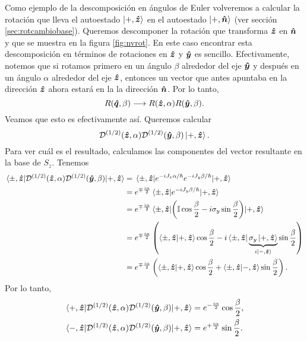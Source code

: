 \documentclass[10pt, a4paper]{article}
\numberwithin{equation}{subsection}
\begin{document}
Como ejemplo de la descomposición en ángulos de Euler volveremos a calcular la
rotación que lleva el autoestado $\ket{+,\vu*{z}}$ en el autoestado
$\ket{+,\vu*{n}}$ (ver sección \ref{sec:rotcambiobase}). Queremos descomponer
la rotación que transforma $\vu*{z}$ en $\vu*{n}$ y que se muestra en la
figura \ref{fig:nvrot}. En este caso encontrar esta descomposición en términos
de rotaciones en $\vu*{z}$ y $\vu*{y}$ es sencillo. Efectivamente, notemos
que si rotamos primero en un ángulo $\beta$ alrededor del eje $\vu*{y}$ y
después en un ángulo $\alpha$ alrededor del eje $\vu*{z}$, entonces un vector
que antes apuntaba en la dirección $\vu*{z}$ ahora estará en la la dirección
$\vu*{n}$. Por lo tanto,
\begin{equation}
  R(\vu*{q},\beta) \longrightarrow R(\vu*{z},\alpha)R(\vu*{y},\beta).
\end{equation}
Veamos que esto es efectivamente así. Queremos calcular
\begin{equation}
  \RotationOp[1/2](\vers{z},\alpha)\RotationOp[1/2](\vers{y},\beta)\ket{+,\vers{z}}.
\end{equation}
Para ver cuál es el resultado, calculamos las componentes del vector resultante
en la base de $S_z$. Tenemos
\begin{align}
  \matrixel{\pm,\vers{z}} {\RotationOp[1/2](\vers{z},\alpha)
    \RotationOp[1/2](\vers{y},\beta)}{+,\vers{z}} &=
    \matrixel{\pm,\vers{z}} {e^{-iJ_z\alpha/\hbar} e^{-iJ_y\beta/\hbar}}
    {+,\vers{z}} \nonumber \\
  &= e^{\mp \frac{i \alpha}{2}} \matrixel{\pm,\vers{z}}{e^{-iJ_y\beta/\hbar}}
    {+,\vers{z}} \nonumber \\
  &= e^{\mp \frac{i \alpha}{2}} \matrixel{\pm,\vers{z}}{\left(
    \Id\cos\frac{\beta}{2} -i\sigma_y\sin\frac{\beta}{2}\right)} {+,\vers{z}}
    \nonumber \\
  &= e^{\mp \frac{i \alpha}{2}} \left(\braket{\pm,\vers{z}}{+,\vers{z}}
    \cos\frac{\beta}{2} -i\bra{\pm,\vers{z}}
    \underbrace{\sigma_y\ket{+,\vers{z}}}_{i\ket{-,\vers{z}}}
    \sin\frac{\beta}{2}\right) \nonumber \\
  &= e^{\mp \frac{i \alpha}{2}} \left(\braket{\pm,\vers{z}}{+,\vers{z}}
    \cos\frac{\beta}{2} + \braket{\pm,\vers{z}}{-,\vers{z}}
    \sin\frac{\beta}{2}\right).
\end{align}
Por lo tanto,
\begin{align}
  \matrixel{+,\vers{z}} {\RotationOp[1/2](\vers{z},\alpha)
    \RotationOp[1/2](\vers{y},\beta)}{+,\vers{z}} &=
    e^{-\frac{i \alpha}{2}} \cos\frac{\beta}{2}, \\
  \matrixel{-,\vers{z}} {\RotationOp[1/2](\vers{z},\alpha)
    \RotationOp[1/2](\vers{y},\beta)}{+,\vers{z}} &=
    e^{+\frac{i \alpha}{2}} \sin\frac{\beta}{2}.
\end{align}
\end{document}
